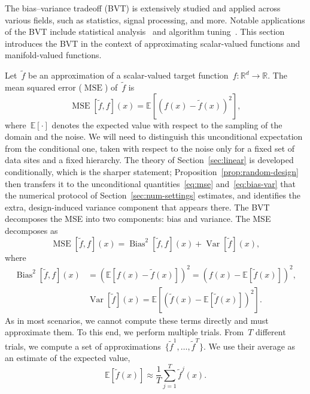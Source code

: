 \documentclass[12pt]{article}
\newcommand{\E}{{\mathbb{E}}}
\newcommand{\R}{\mathbb{R}}
\DeclareMathOperator{\mse}{MSE}
\newcommand{\bias}{\operatorname{Bias}^2}
\DeclareMathOperator{\var}{Var}
\begin{document}
The bias--variance tradeoff (BVT) is extensively studied and applied across various fields, such as statistics, signal processing, and more. Notable applications of the BVT include statistical analysis~\cite{kazashi2021density, kohavi1996bias} and algorithm tuning~\cite{geman1992neural, zhang2022mitigating}. This section introduces the BVT in the context of approximating scalar-valued functions and manifold-valued functions.

Let~$\widetilde{f}$ be an approximation of a scalar-valued target function~$f \colon \R^d \to \R$. The mean squared error ($\mse$) of~$\widetilde{f}$ is
\begin{equation} \label{eq:mse}
    \mse[\widetilde{f},f](x) = \E\left[(f(x) - \widetilde{f}(x))^2\right],
\end{equation}
where~$\E\left[\cdot\right]$ denotes the expected value with respect to the sampling of the domain and the noise. We will need to distinguish this unconditional expectation from the conditional one, taken with respect to the noise only for a fixed set of data sites and a fixed hierarchy. The theory of Section~\ref{sec:linear} is developed conditionally, which is the sharper statement; Proposition~\ref{prop:random-design} then transfers it to the unconditional quantities~\eqref{eq:mse} and~\eqref{eq:bias-var} that the numerical protocol of Section~\ref{sec:num-settings} estimates, and identifies the extra, design-induced variance component that appears there. The BVT decomposes the MSE into two components: bias and variance. The MSE decomposes as
\begin{equation} \label{eq:bvt}
    \mse[\widetilde{f},f](x)  = \bias[\widetilde{f},f](x) + \var[\widetilde{f}](x) ,
\end{equation}
where
\begin{equation}\label{eq:bias-var}
\begin{split} 
    \bias[\widetilde{f},f](x)&=\left(\E \left[ f(x) - \widetilde{f}(x)\right]\right)^2= \left( f(x)  - \E \left[ \widetilde{f}(x) \right] \right)^2, \\
    &\var[\widetilde{f}](x) = \E  \left[\left(\widetilde{f}(x) - \E [\widetilde{f}(x)]\right)^2\right].
\end{split} 
\end{equation}
As in most scenarios, we cannot compute these terms directly and must approximate them. To this end, we perform multiple trials. From~$T$ different trials, we compute a set of approximations~$\{ \widetilde{f}^{1},\ldots,  \widetilde{f}^{T}\}$. We use their average as an estimate of the expected value,
\begin{equation} \label{eq:mc-mean}
    \E \left[\widetilde{f}(x)\right] \approx \frac{1}{T} \sum_{j=1}^{T} \widetilde{f}^j(x).
\end{equation}
\end{document}
